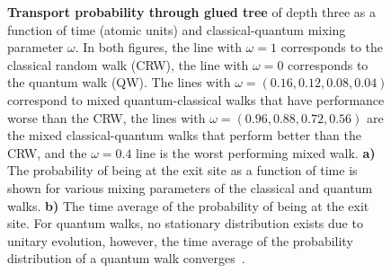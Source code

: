 \documentclass[11pt,oneside,final]{huthesis}%
\begin{document}
\begin{figure}[htb]
\begin{center}
	\end{center}
	\caption{\textbf{Transport probability through glued tree} of depth three as a function of time (atomic units) and classical-quantum mixing parameter $\omega$.  In both figures, the line with $\omega=1$ corresponds to the classical random walk (CRW), the line with $\omega=0$ corresponds to the quantum walk (QW). The lines with $\omega=(0.16,0.12,0.08,0.04)$ correspond to mixed quantum-classical walks that have performance worse than the CRW, the lines with $\omega=(0.96,0.88,0.72,0.56)$ are the mixed classical-quantum walks that perform better than the CRW, and the $\omega=0.4$ line is the worst performing mixed walk.   \textbf{a)} The probability of being at the exit site as a function of time is shown for various mixing parameters of the classical and quantum walks.  \textbf{b)} The time average of the probability of being at the exit site.   For quantum walks, no stationary distribution exists due to unitary evolution, however, the time average of the probability distribution of a quantum walk converges~\cite{Aharonov01}. }\label{fig:G3}
\end{figure}
\end{document}
